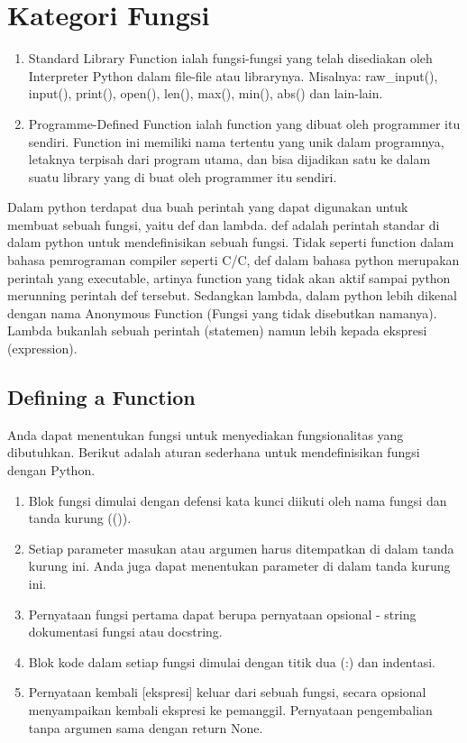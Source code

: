 \section{Kategori Fungsi}
\begin{enumerate}
\item Standard Library Function ialah fungsi-fungsi yang telah disediakan oleh Interpreter Python dalam file-file atau librarynya.  Misalnya: raw\_input(), input(), print(), open(), len(), max(), min(), abs()  dan lain-lain. 
\item Programme-Defined Function ialah function yang dibuat oleh programmer itu sendiri. Function ini memiliki nama tertentu yang unik dalam programnya, letaknya terpisah dari program utama, dan bisa dijadikan satu ke dalam suatu library yang di buat oleh programmer itu sendiri.
\end{enumerate}

Dalam python terdapat dua buah perintah yang dapat digunakan untuk membuat sebuah fungsi, yaitu def dan lambda. def adalah perintah standar di dalam python untuk mendefinisikan sebuah fungsi. Tidak seperti function dalam bahasa pemrograman compiler seperti C/C\+\+, def dalam bahasa python merupakan perintah yang executable, artinya function yang tidak akan aktif sampai python merunning perintah def tersebut. Sedangkan lambda, dalam python lebih dikenal dengan nama Anonymous Function (Fungsi yang tidak disebutkan namanya). Lambda bukanlah sebuah perintah (statemen) namun lebih kepada ekspresi (expression).


\subsection{Defining a Function} 
Anda dapat menentukan fungsi untuk menyediakan fungsionalitas yang dibutuhkan. Berikut adalah aturan sederhana untuk mendefinisikan fungsi dengan Python. 
\begin{enumerate}
\item Blok fungsi dimulai dengan defensi kata kunci diikuti oleh nama fungsi dan tanda kurung (()).
\item Setiap parameter masukan atau argumen harus ditempatkan di dalam tanda kurung ini. Anda juga dapat menentukan parameter di dalam tanda kurung ini.
\item Pernyataan fungsi pertama dapat berupa pernyataan opsional - string dokumentasi fungsi atau docstring.
\item Blok kode dalam setiap fungsi dimulai dengan titik dua (:) dan indentasi.
\item Pernyataan kembali [ekspresi] keluar dari sebuah fungsi, secara opsional menyampaikan kembali ekspresi ke pemanggil. Pernyataan pengembalian tanpa argumen sama dengan return None.
\end{enumerate}


